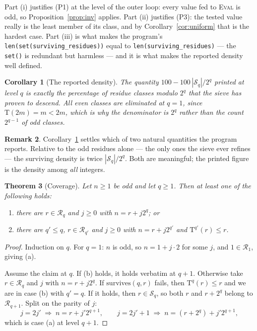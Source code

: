 \documentclass[11pt,a4paper]{article}
\theoremstyle{plain}
\newtheorem{theorem}{Theorem}[section]
\newtheorem{corollary}[theorem]{Corollary}
\theoremstyle{definition}
\newtheorem{remark}[theorem]{Remark}
\newcommand{\Tmap}{\mathrm{T}}
\newcommand{\Rlev}{\mathcal{R}}
\newcommand{\Slev}{\mathcal{S}}
\begin{document}
Part (i) justifies (P1) at the level of the outer loop: every value fed to
\textsc{Eval} is odd, so Proposition~\ref{prop:inv} applies. Part (ii)
justifies (P3): the tested value really is the least member of its class, and
by Corollary~\ref{cor:uniform} that is the hardest case. Part (iii) is what
makes the program's \texttt{len(set(surviving\_residues))} equal to
\texttt{len(surviving\_residues)} --- the \texttt{set()} is redundant but
harmless --- and it is what makes the reported density well defined.

\begin{corollary}[The reported density]\label{cor:density}
The quantity $100 - 100\,|\Slev_{q}|/2^{q}$ printed at level $q$ is exactly the
percentage of residue classes modulo $2^{q}$ that the sieve has proven to
descend. All even classes are eliminated at $q=1$, since
$\Tmap(2m) = m < 2m$, which is why the denominator is $2^{q}$ rather than the
count $2^{q-1}$ of odd classes.
\end{corollary}

\begin{remark}
Corollary~\ref{cor:density} settles which of two natural quantities the
program reports. Relative to the odd residues alone --- the only ones the
sieve ever refines --- the surviving density is twice
$|\Slev_{q}|/2^{q}$. Both are meaningful; the printed figure is the density
among \emph{all} integers.
\end{remark}

\begin{theorem}[Coverage]\label{thm:cov}
Let $n \geq 1$ be odd and let $q \geq 1$. Then at least one of the following
holds:
\begin{enumerate}\itemsep1pt
\item[(a)] there are $r \in \Rlev_{q}$ and $j \geq 0$ with $n = r + j2^{q}$; or
\item[(b)] there are $q' \leq q$, $r \in \Rlev_{q'}$ and $j \geq 0$ with
      $n = r + j 2^{q'}$ and $\Tmap^{q'}(r) \leq r$.
\end{enumerate}
\end{theorem}

\begin{proof}
Induction on $q$. For $q=1$: $n$ is odd, so $n = 1 + j\cdot 2$ for some $j$,
and $1 \in \Rlev_{1}$, giving (a).

Assume the claim at $q$. If (b) holds, it holds verbatim at $q+1$. Otherwise
take $r \in \Rlev_{q}$ and $j$ with $n = r + j2^{q}$.
If $\mathrm{survives}(q,r)$ fails, then $\Tmap^{q}(r) \leq r$ and we are in
case (b) with $q' = q$. If it holds, then $r \in \Slev_{q}$, so both $r$ and
$r + 2^{q}$ belong to $\Rlev_{q+1}$. Split on the parity of $j$:
\[
  j = 2j' \;\Rightarrow\; n = r + j'2^{q+1},
  \qquad
  j = 2j' + 1 \;\Rightarrow\; n = (r + 2^{q}) + j'2^{q+1},
\]
which is case (a) at level $q+1$.
\end{proof}
\end{document}
